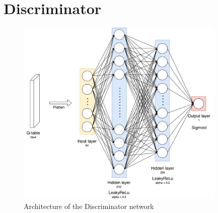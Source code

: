 \section{Discriminator}
\begin{figure}
\centering
\includegraphics[width=10cm]{Figures/Discriminator}
\caption{Architecture of the Discriminator network}
\label{fig:Generator}
\end{figure}